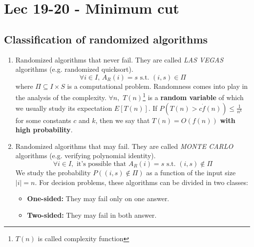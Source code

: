 \chapter{Lec 19-20 - Minimum cut}

\section{Classification of randomized algorithms}
\begin{enumerate}
    \item Randomized algorithms that never fail. They are called \textit{LAS VEGAS} algorithms (e.g. randomized quicksort).
    \[\forall i \in I, \, A_R(i) = s \,\, \text{s.t. } (i,s) \in \Pi\]
    where $\Pi \subseteq I \times S$ is a computational problem.\newline\newline
    Randomness comes into play in the analysis of the complexity. $\forall n, \,\,T(n)$\footnote{$T(n)$ is called complexity function} is a \textbf{random variable} of which we usually study its expectation $E[T(n)]$.\newline\newline
    If $P(T(n) > c \dot f(n)) \leq \frac{1}{n^k}$ for some constants $c$ and $k$, then we say that $T(n) = O(f(n))$ \textbf{with high probability}.

    \item Randomized algorithms that may fail. They are called \textit{MONTE CARLO} algorithms (e.g. verifying polynomial identity).
    \[\forall i \in I, \,\, \text{it's possible that } A_R(i) = s \,\, \text{s.t. } (i,s) \notin \Pi\]
    We study the probability $P((i,s) \notin \Pi)$ as a function of the input size $|i| = n$.\newline\newline
    For decision problems, these algorithms can be divided in two classes:
    \begin{itemize}
        \item \textbf{One-sided:} They may fail only on one answer.

        \item \textbf{Two-sided:} They may fail in both answer.
    \end{itemize}
\end{enumerate}

